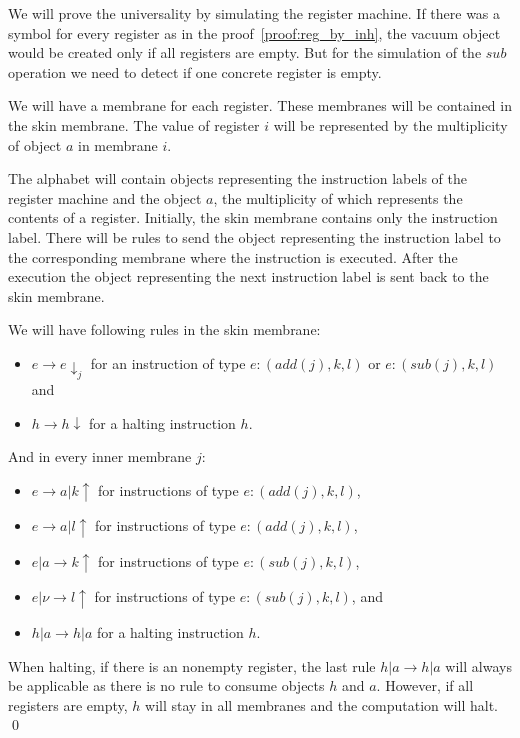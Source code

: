 \begin{dokaz}
  We will prove the universality by simulating the  register machine. If there was a symbol for every register as in the proof~\ref{proof:reg_by_inh}, the vacuum object would be created only if all registers are empty. But for the simulation of the $sub$ operation we need to detect if one concrete register is empty.
  
  We will have a membrane for each register. These membranes will be contained in the skin membrane. The value of register $i$ will be represented by the multiplicity of object $a$ in membrane $i$.
  
  The alphabet will contain objects representing the instruction labels of the register machine and the object $a$, the multiplicity of which represents the contents of a register. Initially, the skin membrane contains only the instruction label. There will be rules to send the object representing the instruction label to the corresponding membrane where the instruction is executed. After the execution the object representing the next instruction label is sent back to the skin membrane.
  
  We will have following rules in the skin membrane:
  
  \begin{itemize}
    \item $e \rightarrow e\downarrow_j$ for an instruction of type $e : (add(j), k, l)$ or $e : (sub(j), k, l)$ and
    \item $h \rightarrow h\downarrow$ for a halting instruction $h$.
  \end{itemize}
  
  And in every inner membrane $j$:
  
  \begin{itemize}
    \item $e \rightarrow a|k\uparrow$ for instructions of type $e : (add(j), k, l)$,
    \item $e \rightarrow a|l\uparrow$ for instructions of type $e : (add(j), k, l)$,
    \item $e|a \rightarrow k\uparrow$ for instructions of type $e : (sub(j), k, l)$,
    \item $e|\nu \rightarrow l\uparrow$ for instructions of type $e : (sub(j), k, l)$, and
    \item $h|a \rightarrow h|a$ for a halting instruction $h$.
  \end{itemize}

  When halting, if there is an nonempty register, the last rule $h|a \rightarrow h|a$ will always be applicable as there is no rule to consume objects $h$ and $a$. However, if all registers are empty, $h$ will stay in all membranes and the computation will halt. \qed  
\end{dokaz}
